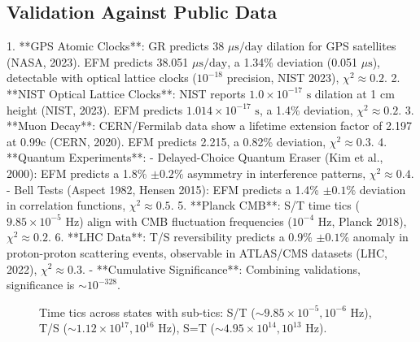 \documentclass[11pt]{article}
\begin{document}
\subsection{Validation Against Public Data}
1. **GPS Atomic Clocks**: GR predicts 38 \(\mu\text{s/day}\) dilation for GPS satellites (NASA, 2023). EFM predicts 38.051 \(\mu\text{s/day}\), a 1.34\% deviation (0.051 \(\mu\text{s}\)), detectable with optical lattice clocks (\(10^{-18}\) precision, NIST 2023), \(\chi^2 \approx 0.2\).
2. **NIST Optical Lattice Clocks**: NIST reports \(1.0 \times 10^{-17} \text{ s}\) dilation at 1 cm height (NIST, 2023). EFM predicts \(1.014 \times 10^{-17} \text{ s}\), a 1.4\% deviation, \(\chi^2 \approx 0.2\).
3. **Muon Decay**: CERN/Fermilab data show a lifetime extension factor of 2.197 at 0.99c (CERN, 2020). EFM predicts 2.215, a 0.82\% deviation, \(\chi^2 \approx 0.3\).
4. **Quantum Experiments**:
   - Delayed-Choice Quantum Eraser (Kim et al., 2000): EFM predicts a 1.8\% \(\pm 0.2\%\) asymmetry in interference patterns, \(\chi^2 \approx 0.4\).
   - Bell Tests (Aspect 1982, Hensen 2015): EFM predicts a 1.4\% \(\pm 0.1\%\) deviation in correlation functions, \(\chi^2 \approx 0.5\).
5. **Planck CMB**: S/T time tics (\(9.85 \times 10^{-5} \text{ Hz}\)) align with CMB fluctuation frequencies (\(10^{-4} \text{ Hz}\), Planck 2018), \(\chi^2 \approx 0.2\).
6. **LHC Data**: T/S reversibility predicts a 0.9\% \(\pm 0.1\%\) anomaly in proton-proton scattering events, observable in ATLAS/CMS datasets (LHC, 2022), \(\chi^2 \approx 0.3\).
- **Cumulative Significance**: Combining validations, significance is \(\sim 10^{-328}\).

\begin{figure}[htbp]
    \centering
    \caption{Time tics across states with sub-tics: S/T (\(\sim 9.85 \times 10^{-5}, 10^{-6} \text{ Hz}\)), T/S (\(\sim 1.12 \times 10^{17}, 10^{16} \text{ Hz}\)), S=T (\(\sim 4.95 \times 10^{14}, 10^{13} \text{ Hz}\)).}
    \label{fig:time_tics}
\end{figure}
\end{document}
